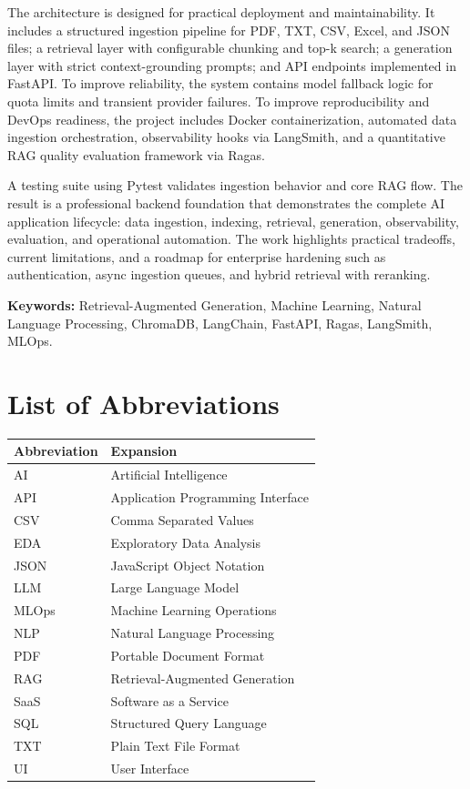 \documentclass[12pt,letterpaper]{report}
\begin{document}
The architecture is designed for practical deployment and maintainability. It includes a structured ingestion pipeline for PDF, TXT, CSV, Excel, and JSON files; a retrieval layer with configurable chunking and top-k search; a generation layer with strict context-grounding prompts; and API endpoints implemented in FastAPI. To improve reliability, the system contains model fallback logic for quota limits and transient provider failures. To improve reproducibility and DevOps readiness, the project includes Docker containerization, automated data ingestion orchestration, observability hooks via LangSmith, and a quantitative RAG quality evaluation framework via Ragas.

A testing suite using Pytest validates ingestion behavior and core RAG flow. The result is a professional backend foundation that demonstrates the complete AI application lifecycle: data ingestion, indexing, retrieval, generation, observability, evaluation, and operational automation. The work highlights practical tradeoffs, current limitations, and a roadmap for enterprise hardening such as authentication, async ingestion queues, and hybrid retrieval with reranking.

\textbf{Keywords:} Retrieval-Augmented Generation, Machine Learning, Natural Language Processing, ChromaDB, LangChain, FastAPI, Ragas, LangSmith, MLOps.

\tableofcontents
\listoffigures
\listoftables

\chapter*{List of Abbreviations}
\begin{longtable}{p{}p{}}
\textbf{Abbreviation} & \textbf{Expansion} \\
\hline
AI & Artificial Intelligence \\
API & Application Programming Interface \\
CSV & Comma Separated Values \\
EDA & Exploratory Data Analysis \\
JSON & JavaScript Object Notation \\
LLM & Large Language Model \\
MLOps & Machine Learning Operations \\
NLP & Natural Language Processing \\
PDF & Portable Document Format \\
RAG & Retrieval-Augmented Generation \\
SaaS & Software as a Service \\
SQL & Structured Query Language \\
TXT & Plain Text File Format \\
UI & User Interface \\
\end{longtable}
\end{document}
